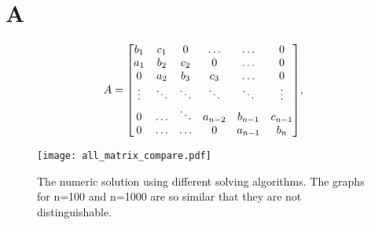 \onecolumn
\setcounter{equation}{0}
\renewcommand\theequation{A.\arabic{equation}}
\section*{A}
\label{sec:appendix}

  \[A =
    \mqty[b_1 & c_1 & 0 & \hdots & \hdots & 0 \\
          a_1 & b_2 & c_2 & 0 & \hdots & 0 \\
          0 & a_2 & b_3 & c_3 & \hdots & 0 \\
          \vdots & \ddots & \ddots & \ddots & \ddots & \vdots \\
          0 & \hdots & \ddots & a_{n-2} & b_{n-1} & c_{n-1} \\
          0 & \hdots & \hdots & 0 & a_{n-1} & b_n],
  \]

\begin{figure}[htbp]
	\centering
	\texttt{[image: all\_matrix\_compare.pdf]}
	\caption{The numeric solution using different solving algorithms. The graphs for n=100 and n=1000 are so similar that they are not distinguishable.}
	\label{fig:all}
\end{figure}
